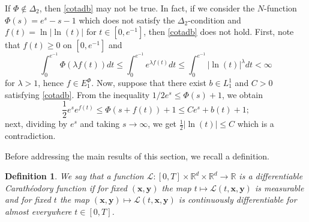 \documentclass[twoside]{elsarticle}
\newtheorem{defi}[thm]{Definition}
\theoremstyle{remark}
\newcommand{\ephi}{E^{\Phi}}
\renewcommand{\b}[1]{\boldsymbol{#1}}
\renewcommand{\leq}{\leqslant}
\begin{document}
 If $\Phi\notin\Delta_2$, then \eqref{cotadb}  may not be true.  In fact,  if we consider the $N$-function $\Phi(s)=e^s-s-1$ which does not satisfy the $\Delta_2$-condition and $f(t)=\ln|\ln(t)|$ for $t\in [0,e^{-1}]$, then \eqref{cotadb} does not hold.  First, note that $f(t)\geq 0$ on $[0,e^{-1}]$ and 
\[\int_0^{e^{-1}}\Phi(\lambda f(t))dt\leq 
\int_0^{e^{-1}} e^{\lambda f(t)}dt\leq \int_0^{e^{-1}}|\ln(t)|^{\lambda}dt<\infty\]
for $\lambda>1$, hence $f\in\ephi_1$. 
Now, suppose that there exist $b\in L^1_1$ and $C>0$ satisfying \eqref{cotadb}. 
From the inequality $1/2 e^s\leq \Phi(s)+1$, we obtain
\[\frac12 e^s e^{f(t)}\leq \Phi(s+f(t))+1\leq Ce^s+b(t)+1;\]
next, dividing by $e^s$ and taking $s\to\infty$, we get $\tfrac12|\ln(t)|\leq C$ which is a contradiction. 

 Before addressing the main results of this section, we recall a definition.  


\begin{defi} We say that a function $\mathcal{L}:[0,T]\times \mathbb{R}^d \times \mathbb{R}^d \rightarrow \mathbb{R}$ is a \emph{differentiable Carath\'eodory} function if for fixed $(\b{x},\b{y})$
the map $t \mapsto \mathcal{L}(t, \b{x},\b{y})$ is measurable  and for fixed $t$ the map  $(\b{x},\b{y}) \mapsto \mathcal{L}(t, \b{x}, \b{y})$ is continuously differentiable for almost everywhere $t\in [0,T]$.

\end{defi}
\end{document}
